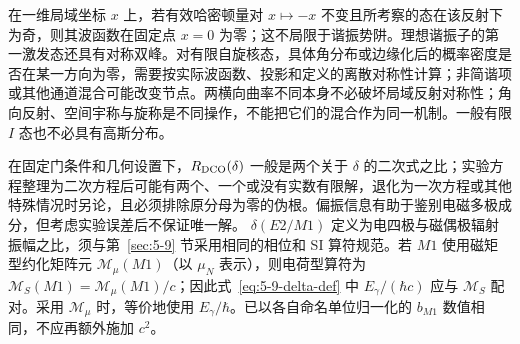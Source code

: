 在一维局域坐标 $x$ 上，若有效哈密顿量对 $x\mapsto-x$ 不变且所考察的态在该反射下为奇，则其波函数在固定点 $x=0$ 为零；这不局限于谐振势阱。理想谐振子的第一激发态还具有对称双峰。对有限自旋核态，具体角分布或边缘化后的概率密度是否在某一方向为零，需要按实际波函数、投影和定义的离散对称性计算；非简谐项或其他通道混合可能改变节点。两横向曲率不同本身不必破坏局域反射对称性；角向反射、空间宇称与旋称是不同操作，不能把它们的混合作为同一机制。一般有限 $I$ 态也不必具有高斯分布。

在固定门条件和几何设置下，$R_{\rm DCO}(\delta)$ 一般是两个关于 $\delta$ 的二次式之比；实验方程整理为二次方程后可能有两个、一个或没有实数有限解，退化为一次方程或其他特殊情况时另论，且必须排除原分母为零的伪根。偏振信息有助于鉴别电磁多极成分，但考虑实验误差后不保证唯一解。
$\delta(E2/M1)$ 定义为电四极与磁偶极辐射振幅之比，须与第~\ref{sec:5-9} 节采用相同的相位和 SI 算符规范。若 $M1$ 使用磁矩型约化矩阵元 $\mathcal M_\mu(M1)$（以 $\mu_N$ 表示），则电荷型算符为 $\mathcal M_S(M1)=\mathcal M_\mu(M1)/c$；因此式~\eqref{eq:5-9-delta-def} 中 $E_\gamma/(\hbar c)$ 应与 $\mathcal M_S$ 配对。采用 $\mathcal M_\mu$ 时，等价地使用 $E_\gamma/\hbar$。已以各自命名单位归一化的 $b_{M1}$ 数值相同，不应再额外施加 $c^2$。
